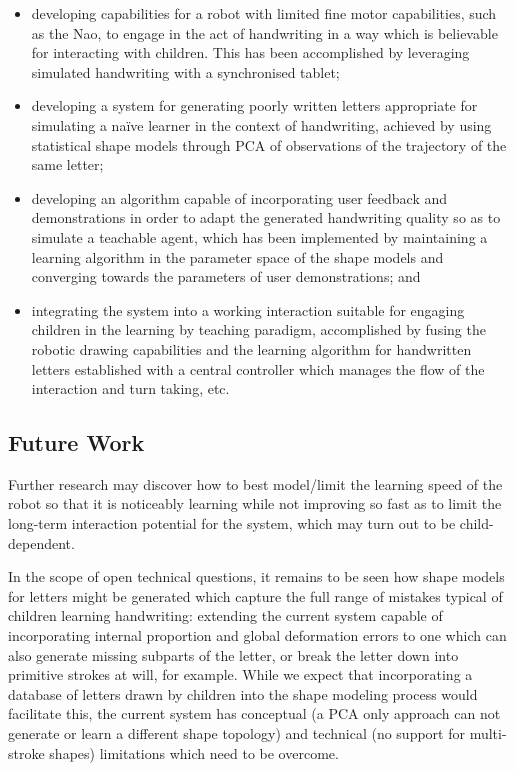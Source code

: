 \documentclass{sig-alternate}
\begin{document}
\begin{itemize}

    \item developing capabilities for a robot with limited fine motor
        capabilities, such as the Nao, to engage in the act of handwriting in a
        way which is believable for interacting with children. This has been
        accomplished by leveraging simulated handwriting with a synchronised
        tablet;

    \item developing a system for generating poorly written letters appropriate
        for simulating a na\"ive learner in the context of handwriting, achieved
        by using statistical shape models through PCA of observations of the
        trajectory of the same letter;

    \item developing an algorithm capable of incorporating user feedback and
        demonstrations in order to adapt the generated handwriting quality so as
        to simulate a teachable agent, which has been implemented by maintaining
        a learning algorithm in the parameter space of the shape models and
        converging towards the parameters of user demonstrations; and

    \item integrating the system into a working interaction suitable for
        engaging children in the learning by teaching paradigm, accomplished by
        fusing the robotic drawing capabilities and the learning algorithm for
        handwritten letters established with a central controller which manages
        the flow of the interaction and turn taking, etc.

\end{itemize}



\subsection{Future Work}



Further research may discover how to best model/limit the learning speed of the
robot so that it is noticeably learning while not improving so fast as to limit
the long-term interaction potential for the system, which may turn out to be
child-dependent.


In the scope of open technical questions, it remains to be seen how shape models
for letters might be generated which capture the full range of mistakes typical
of children learning handwriting: extending the current system capable of
incorporating internal proportion and global deformation errors to one which can
also generate missing subparts of the letter, or break the letter down into
primitive strokes at will, for example. While we expect that incorporating a
database of letters drawn by children into the shape modeling process would
facilitate this, the current system has conceptual (a PCA only approach can not
generate or learn a different shape topology) and technical (no support for
multi-stroke shapes) limitations which need to be overcome.
\end{document}
